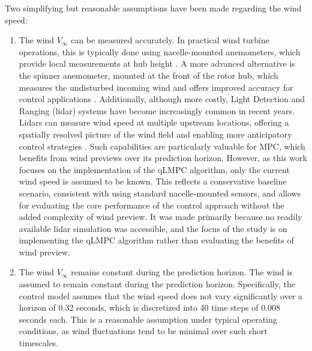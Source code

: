Two simplifying but reasonable assumptions have been made regarding the wind speed:
%
\begin{enumerate}
    \item 
    The wind \(V_{\infty}\) can be measured accurately. In practical wind turbine operations, this is typically done using nacelle-mounted anemometers, which provide local measurements at hub height \cite{smith2002applicability}. A more advanced alternative is the spinner anemometer, mounted at the front of the rotor hub, which measures the undisturbed incoming wind and offers improved accuracy for control applications \cite{demurtas2017spinaranemometer}. Additionally, although more costly, Light Detection and Ranging (lidar) systems have become increasingly common in recent years. Lidars can measure wind speed at multiple upstream locations, offering a spatially resolved picture of the wind field and enabling more anticipatory control strategies \cite{schlipf2013nonlinear}. Such capabilities are particularly valuable for MPC, which benefits from wind previews over its prediction horizon. However, as this work focuses on the implementation of the qLMPC algorithm, only the current wind speed is assumed to be known. This reflects a conservative baseline scenario, consistent with using standard nacelle-mounted sensors, and allows for evaluating the core performance of the control approach without the added complexity of wind preview. It was made primarily because no readily available lidar simulation was accessible, and the focus of the study is on implementing the qLMPC algorithm rather than evaluating the benefits of wind preview.
  \item 
    The wind \(V_{\infty}\) remains constant during the prediction horizon. The wind is assumed to remain constant during the prediction horizon. Specifically, the control model assumes that the wind speed does not vary significantly over a horizon of 0.32 seconds, which is discretized into 40 time steps of 0.008 seconds each. This is a reasonable assumption under typical operating conditions, as wind fluctuations tend to be minimal over such short timescales. 
\end{enumerate}

